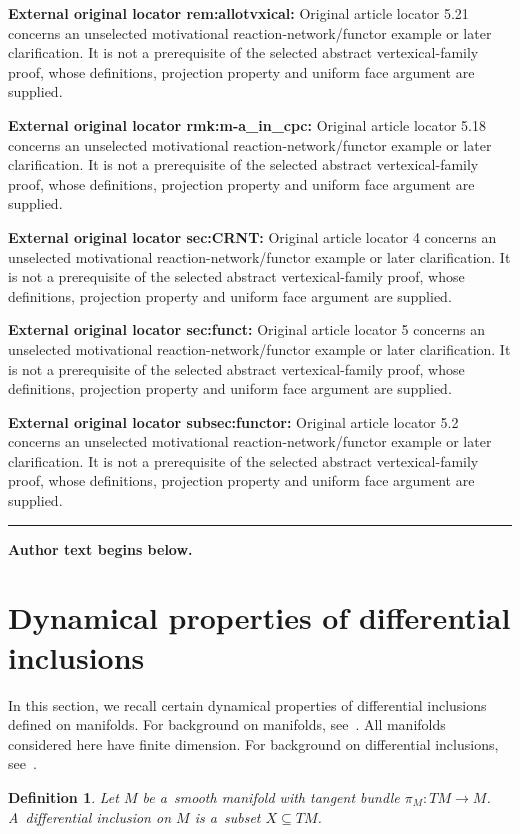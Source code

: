 \documentclass[11pt]{article}
\newtheorem{Definition}[Theorem]{Definition}
\begin{document}
\noindent\textbf{External original locator rem:allotvxical:} Original article locator 5.21 concerns an unselected motivational reaction-network/functor example or later clarification. It is not a prerequisite of the selected abstract vertexical-family proof, whose definitions, projection property and uniform face argument are supplied.\par
\noindent\textbf{External original locator rmk:m-a\_in\_cpc:} Original article locator 5.18 concerns an unselected motivational reaction-network/functor example or later clarification. It is not a prerequisite of the selected abstract vertexical-family proof, whose definitions, projection property and uniform face argument are supplied.\par
\noindent\textbf{External original locator sec:CRNT:} Original article locator 4 concerns an unselected motivational reaction-network/functor example or later clarification. It is not a prerequisite of the selected abstract vertexical-family proof, whose definitions, projection property and uniform face argument are supplied.\par
\noindent\textbf{External original locator sec:funct:} Original article locator 5 concerns an unselected motivational reaction-network/functor example or later clarification. It is not a prerequisite of the selected abstract vertexical-family proof, whose definitions, projection property and uniform face argument are supplied.\par
\noindent\textbf{External original locator subsec:functor:} Original article locator 5.2 concerns an unselected motivational reaction-network/functor example or later clarification. It is not a prerequisite of the selected abstract vertexical-family proof, whose definitions, projection property and uniform face argument are supplied.\par
\medskip\hrule\medskip\noindent\textbf{Author text begins below.}\par
\setcounter{section}{1}
\setcounter{subsection}{0}
\setcounter{subsubsection}{0}
\setcounter{Theorem}{0}
\setcounter{equation}{0}
\section{Dynamical properties of dif\/ferential inclusions}\label{s:dynamical}

In this section, we recall certain dynamical properties of dif\/ferential inclusions def\/ined on ma\-ni\-folds.
For background on manifolds, see~\cite{Lee02smooth}.
All manifolds considered here have f\/inite dimension.
For background on dif\/ferential inclusions, see~\cite{Aubin}.
\begin{Definition}\label{def:diff_incl}
Let $M$ be a~smooth manifold with tangent bundle $\pi_M:TM\to M$.
A~\emph{dif\-fe\-ren\-tial inclusion} on $M$ is a~subset $X\subseteq TM$.
\end{Definition}
\end{document}
